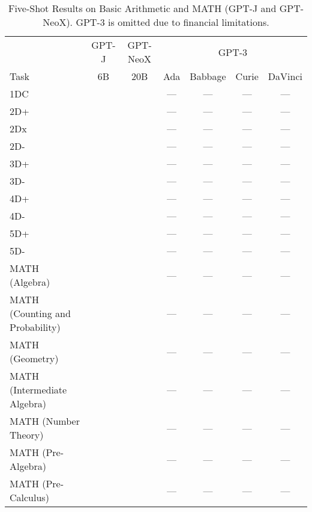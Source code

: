 \documentclass[11pt]{article}
\begin{document}
{\begin{landscape}
\begin{table*}
\centering \begin{tabular}{l c c c c c c } \\ 
& GPT-J & GPT-NeoX & \multicolumn{4}{c}{GPT-3} \\
Task & 6B & 20B & Ada & Babbage & Curie & DaVinci \\ \toprule
1DC &  &  & --- & --- & --- & ---  \\ 
2D+ &  &  & --- & --- & --- & --- \\ 
2Dx &  &  & --- & --- & --- & --- \\ 
2D- &  &  & --- & --- & --- & --- \\ 
3D+ &  &  & --- & --- & --- & --- \\ 
3D- &  &  & --- & --- & --- & --- \\ 
4D+ &  &  & --- & --- & --- & --- \\ 
4D- &  &  & --- & --- & --- & --- \\ 
5D+ &  &  & --- & --- & --- & --- \\ 
5D- &  &  & --- & --- & --- & --- \\ 
MATH (Algebra) &  &  & --- & --- & --- & --- \\ 
MATH (Counting and Probability) &  & & --- & --- & --- & ---  \\ 
MATH (Geometry) &  &  & --- & --- & --- & --- \\ 
MATH (Intermediate Algebra) &  &  & --- & --- & --- & --- \\ 
MATH (Number Theory) &  &  & --- & --- & --- & --- \\ 
MATH (Pre-Algebra) &  &  & --- & --- & --- & --- \\ 
MATH (Pre-Calculus) &  &  & --- & --- & --- & --- \\ 
\bottomrule 
\end{tabular}
\caption{Five-Shot Results on Basic Arithmetic and MATH (GPT-J and GPT-NeoX). GPT-3 is omitted due to financial limitations.}
\label{tab:math_gpt_5}
\end{table*}


\end{landscape}}
\end{document}
